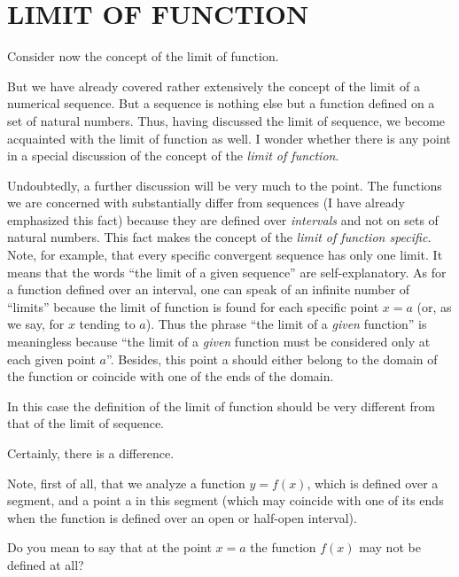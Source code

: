
\chapter{LIMIT OF FUNCTION}
{\parindent=0pt
\athr Consider now the concept of the limit of function.

\rdr But we have already covered rather extensively the concept of the limit of a numerical sequence. But a sequence is nothing else but a function defined on a set of natural numbers. Thus, having discussed the limit of sequence, we become acquainted with the limit of function as well. I wonder whether there is any point in a special discussion of the concept of the \emph{limit of function}.

\athr Undoubtedly, a further discussion will be very much to the point. The functions we are concerned with substantially differ from sequences (I have already emphasized this fact) because they are defined over \emph{intervals} and not on sets of natural numbers. This fact makes the concept
of the \emph{limit of function specific}. Note, for example, that every specific convergent sequence has only one limit. It means that the words ``the limit of a given sequence'' are self-explanatory. As for a function defined over an interval, one can speak of an infinite number of ``limits'' because the limit of function is found for each specific point $x = a$ (or, as we say, for $x$ tending to $a$). Thus the phrase ``the limit of a \emph{given} function'' is meaningless because ``the limit of a \emph{given} function must be considered only at each given point $a$''. Besides, this point a should either belong to the domain of the function or coincide with one of the ends of the domain.

\rdr In this case the definition of the limit of function should be very different from that of the limit of sequence.

\athr Certainly, there is a difference.

Note, first of all, that we analyze a function $y = f (x)$, which is defined over a segment, and a point a in this segment (which may coincide with one of its ends when the function is defined over an open or half-open interval).

\rdr Do you mean to say that at the point $x = a$ the function $f (x)$ may not be defined at all?

}
